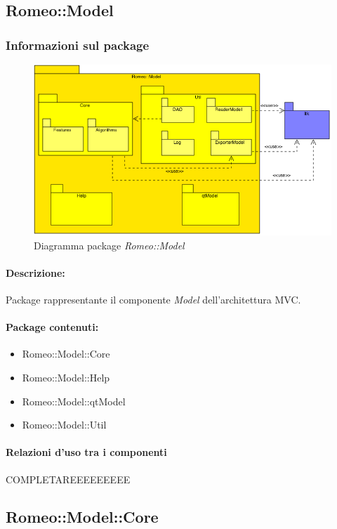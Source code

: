 	\subsection{Romeo::Model}
		\subsubsection{Informazioni sul package}
			\begin{figure}[!h]
				\centering
				\includegraphics[scale=0.5]{./Content/Immagini/Romeo__Model.png}
				\caption{Diagramma package \textsl{Romeo::Model}}
			\end{figure}
			\paragraph{Descrizione:}Package\g{} rappresentante il componente \textsl{Model} dell'architettura MVC\g{}.
			\paragraph{Package contenuti:}
				\begin{itemize}
					\item Romeo::Model::Core
					\item Romeo::Model::Help
					\item Romeo::Model::qtModel
					\item Romeo::Model::Util
				\end{itemize}
			\paragraph{Relazioni d'uso tra i componenti}
COMPLETAREEEEEEEEE	\subsection{Romeo::Model::Core}
